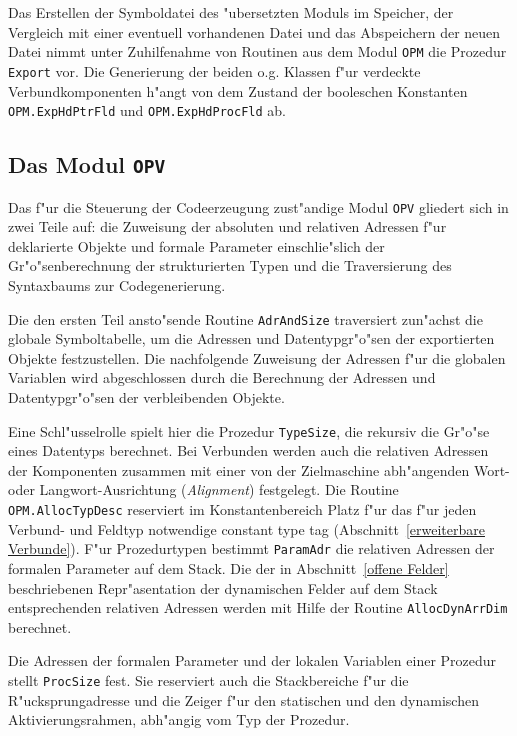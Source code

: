 \medskip

Das Erstellen der Symboldatei des "ubersetzten Moduls im Speicher, der
Vergleich mit einer eventuell vorhandenen Datei und das Abspeichern der
neuen Datei nimmt unter Zuhilfenahme von Routinen aus dem Modul {\tt OPM}
die Prozedur {\tt Export} vor.
Die Generierung der beiden o.g. Klassen f"ur verdeckte Verbundkomponenten
h"angt von dem Zustand der booleschen Konstanten {\tt OPM.ExpHdPtrFld} und
{\tt OPM.ExpHdProcFld} ab.

\subsection{Das Modul {\tt OPV}}
\label{OPV}

Das f"ur die Steuerung der Codeerzeugung zust"andige Modul {\tt OPV} gliedert
sich in zwei Teile auf: die Zuweisung der absoluten und relativen Adressen
f"ur deklarierte Objekte und formale Parameter einschlie"slich der
Gr"o"senberechnung der strukturierten Typen und die Traversierung des Syntaxbaums
zur Codegenerierung.

Die den ersten Teil ansto"sende Routine {\tt AdrAndSize} traversiert zun"achst
die globale Symboltabelle, um die Adressen und Datentypgr"o"sen der exportierten
Objekte festzustellen.
Die nachfolgende Zuweisung der Adressen f"ur die globalen Variablen wird
abgeschlossen durch die Berechnung der Adressen und Datentypgr"o"sen der
verbleibenden Objekte.

Eine Schl"usselrolle spielt hier die Prozedur {\tt TypeSize}, die rekursiv
die Gr"o"se eines Datentyps berechnet.
Bei Verbunden werden auch die relativen Adressen der Komponenten zusammen
mit einer von der Zielmaschine abh"angenden Wort- oder Langwort-Ausrichtung
({\it Alignment\/}) festgelegt.
Die Routine {\tt OPM.AllocTypDesc} reserviert im Konstantenbereich Platz f"ur
das f"ur jeden Verbund- und Feldtyp notwendige constant type tag
(Abschnitt~\ref{erweiterbare Verbunde}).
F"ur Prozedurtypen bestimmt {\tt ParamAdr} die relativen Adressen der formalen
Parameter auf dem Stack.
Die der in Abschnitt~\ref{offene Felder} beschriebenen Repr"asentation der dynamischen
Felder auf dem Stack entsprechenden relativen Adressen werden mit Hilfe
der Routine {\tt AllocDynArrDim} berechnet.

Die Adressen der formalen Parameter und der lokalen Variablen einer Prozedur
stellt {\tt ProcSize} fest.
Sie reserviert auch die Stackbereiche f"ur die R"ucksprungadresse und die
Zeiger f"ur den statischen und den dynamischen Aktivierungsrahmen, %
abh"angig vom Typ der Prozedur.

